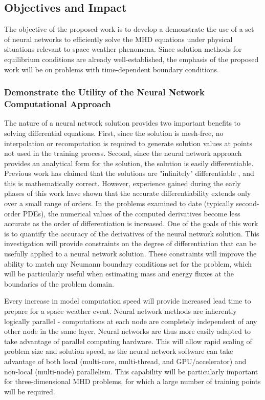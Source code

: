\documentclass{article}
\begin{document}
\subsection{Objectives and Impact}

The objective of the proposed work is to develop a demonstrate the use of a set of neural networks to efficiently solve the MHD equations under physical situations relevant to space weather phenomena. Since solution methods for equilibrium conditions are already well-established, the emphasis of the proposed work will be on problems with time-dependent boundary conditions.

\subsubsection{Demonstrate the Utility of the Neural Network Computational Approach}

The nature of a neural network solution provides two important benefits to solving differential equations. First, since the solution is mesh-free, no interpolation or recomputation is required to generate solution values at points not used in the training process. Second, since the neural network approach provides an analytical form for the solution, the solution is easily differentiable. Previous work has claimed that the solutions are "infinitely" differentiable \cite{Lagaris1998}, and this is mathematically correct. However, experience gained during the early phases of this work have shown that the accurate differentiability extends only over a small range of orders. In the problems examined to date (typically second-order PDEs), the numerical values of the computed  derivatives become less accurate as the order of differentiation is increased. One of the goals of this work is to quantify the accuracy of the derivatives of the neural network solution. This investigation will provide constraints on the degree of differentiation that can be usefully applied to a neural network solution. These constraints will improve the ability to match any Neumann boundary conditions set for the problem, which will be particularly useful when estimating mass and energy fluxes at the boundaries of the problem domain.

Every increase in model computation speed will provide increased lead time to prepare for a space weather event. Neural network methods are inherently logically parallel - computations at each node are completely independent of any other node in the same layer. Neural networks are thus more easily adapted to take advantage of parallel computing hardware. This will allow rapid scaling of problem size and solution speed, as the neural network software can take advantage of both local (multi-core, multi-thread, and GPU/accelerator) and non-local (multi-node) parallelism. This capability will be particularly important for three-dimensional MHD problems, for which a large number of training points will be required.
\end{document}
